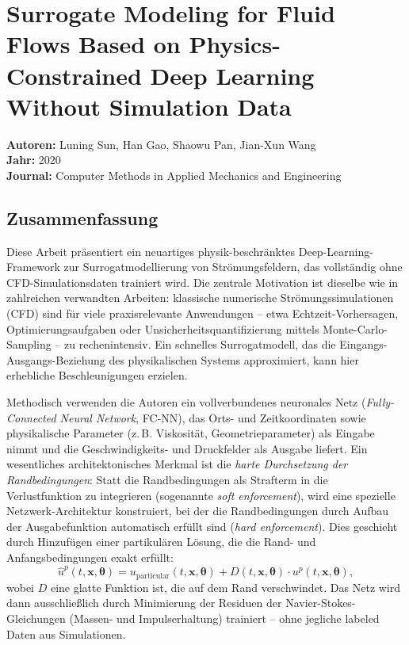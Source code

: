 \documentclass[a4paper,12pt]{article}
\begin{document}
\section*{Surrogate Modeling for Fluid Flows Based on Physics-Constrained Deep Learning Without Simulation Data}

\textbf{Autoren:} Luning Sun, Han Gao, Shaowu Pan, Jian-Xun Wang \\
\textbf{Jahr:} 2020 \\
\textbf{Journal:} Computer Methods in Applied Mechanics and Engineering

\subsection*{Zusammenfassung}

Diese Arbeit präsentiert ein neuartiges physik-beschränktes Deep-Learning-Framework zur Surrogatmodellierung von Strömungsfeldern, das vollständig ohne CFD-Simulationsdaten trainiert wird. Die zentrale Motivation ist dieselbe wie in zahlreichen verwandten Arbeiten: klassische numerische Strömungssimulationen (CFD) sind für viele praxisrelevante Anwendungen -- etwa Echtzeit-Vorhersagen, Optimierungsaufgaben oder Unsicherheitsquantifizierung mittels Monte-Carlo-Sampling -- zu rechenintensiv. Ein schnelles Surrogatmodell, das die Eingangs-Ausgangs-Beziehung des physikalischen Systems approximiert, kann hier erhebliche Beschleunigungen erzielen.

Methodisch verwenden die Autoren ein vollverbundenes neuronales Netz (\textit{Fully-Connected Neural Network}, FC-NN), das Orts- und Zeitkoordinaten sowie physikalische Parameter (z.\,B. Viskosität, Geometrieparameter) als Eingabe nimmt und die Geschwindigkeits- und Druckfelder als Ausgabe liefert. Ein wesentliches architektonisches Merkmal ist die \textit{harte Durchsetzung der Randbedingungen}: Statt die Randbedingungen als Strafterm in die Verlustfunktion zu integrieren (sogenannte \textit{soft enforcement}), wird eine spezielle Netzwerk-Architektur konstruiert, bei der die Randbedingungen durch Aufbau der Ausgabefunktion automatisch erfüllt sind (\textit{hard enforcement}). Dies geschieht durch Hinzufügen einer partikulären Lösung, die die Rand- und Anfangsbedingungen exakt erfüllt:
\[
\hat{u}^p(t, \mathbf{x}, \boldsymbol{\theta}) = u_{\text{particular}}(t, \mathbf{x}, \boldsymbol{\theta}) + D(t, \mathbf{x}, \boldsymbol{\theta}) \cdot u^p(t, \mathbf{x}, \boldsymbol{\theta}),
\]
wobei $D$ eine glatte Funktion ist, die auf dem Rand verschwindet. Das Netz wird dann ausschließlich durch Minimierung der Residuen der Navier-Stokes-Gleichungen (Massen- und Impulserhaltung) trainiert -- ohne jegliche labeled Daten aus Simulationen.
\end{document}
